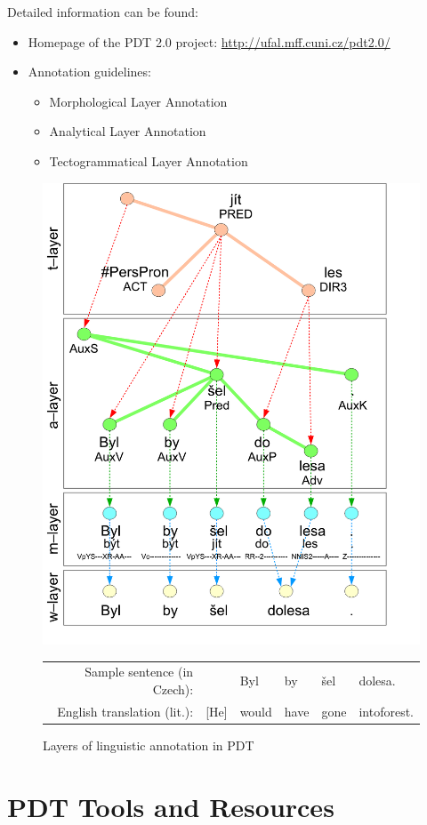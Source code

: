 Detailed information can be found:
\begin{itemize}
	\item Homepage of the PDT 2.0 project: \url{http://ufal.mff.cuni.cz/pdt2.0/}
	\item Annotation guidelines:	
	\begin{itemize}
		\item Morphological Layer Annotation \citep{mmanCz2005}
		\item Analytical Layer Annotation \citep{amanEn1999}
		\item Tectogrammatical Layer Annotation \citep{biblio:MiBeAnnotationtectogrammatical2006}
	\end{itemize}	
\end{itemize}






\begin{figure}
	\begin{center}
	\includegraphics[width=0.6\hsize]{PDT_layers}
		\begin{tabular}{rlllll}
Sample sentence (in Czech): & & Byl & by & šel & dolesa.\\
English translation (lit.):& [He] & would & have & gone & intoforest.			
		\end{tabular}
	\end{center}
\caption{Layers of linguistic annotation in PDT}
\label{fig:ch30_layers}
\end{figure}





\section{PDT Tools and Resources}



